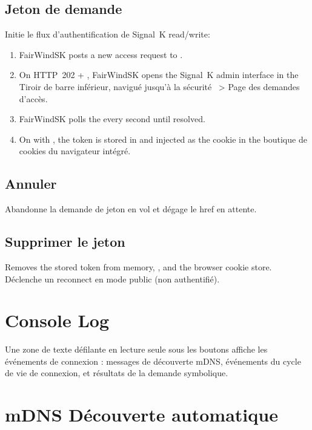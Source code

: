 \subsection{Jeton de demande}

Initie le flux d'authentification de Signal~K read/write:

\begin{enumerate}
  \item FairWindSK posts a new access request to .
  \item On HTTP~202 + , FairWindSK opens the Signal~K admin interface in the
Tiroir de barre inférieur, navigué jusqu'à la sécurité ~> Page des demandes d'accès.
  \item FairWindSK polls the  every second until resolved.
  \item On  with , the token is stored in
         and injected as the  cookie in the
boutique de cookies du navigateur intégré.
\end{enumerate}

\subsection{Annuler}

Abandonne la demande de jeton en vol et dégage le href en attente.

\subsection{Supprimer le jeton}

Removes the stored token from memory, , and the browser cookie store.
Déclenche un reconnect en mode public (non authentifié).

\section{Console Log}

Une zone de texte défilante en lecture seule sous les boutons affiche les événements de connexion :
messages de découverte mDNS, événements du cycle de vie de connexion, et résultats de la demande symbolique.

\section{mDNS Découverte automatique}

